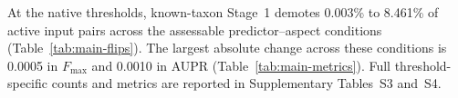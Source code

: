 At the native thresholds, known-taxon Stage~1 demotes 0.003\% to 8.461\% of active input pairs across the assessable predictor--aspect conditions (Table~\ref{tab:main-flips}). The largest absolute change across these conditions is 0.0005 in $F_{\max}$ and 0.0010 in AUPR (Table~\ref{tab:main-metrics}). Full threshold-specific counts and metrics are reported in Supplementary Tables~S3 and~S4.
